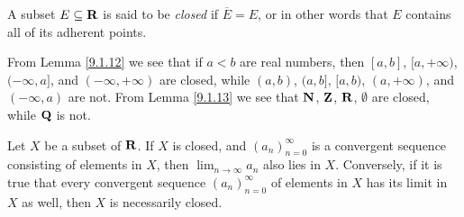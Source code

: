\begin{definition}\label{9.1.15}
    A subset \(E \subseteq \mathbf{R}\) is said to be \emph{closed} if \(\overline{E} = E\), or in other words that \(E\) contains all of its adherent points.
\end{definition}

\begin{example}\label{9.1.16}
    From Lemma \ref{9.1.12} we see that if \(a < b\) are real numbers, then \([a, b]\), \([a, +\infty)\), \((-\infty, a]\), and \((-\infty, +\infty)\) are closed, while \((a, b)\), \((a, b]\), \([a, b)\), \((a, +\infty)\), and \((-\infty, a)\) are not.
    From Lemma \ref{9.1.13} we see that \(\mathbf{N}\), \(\mathbf{Z}\), \(\mathbf{R}\), \(\emptyset\) are closed, while \(\mathbf{Q}\) is not.
\end{example}

\begin{corollary}\label{9.1.17}
    Let \(X\) be a subset of \(\mathbf{R}\).
    If \(X\) is closed, and \((a_n)_{n = 0}^\infty\) is a convergent sequence consisting of elements in \(X\), then \(\lim_{n \to \infty} a_n\) also lies in \(X\).
    Conversely, if it is true that every convergent sequence \((a_n)_{n = 0}^\infty\) of elements in \(X\) has its limit in \(X\) as well, then \(X\) is necessarily closed.
\end{corollary}

